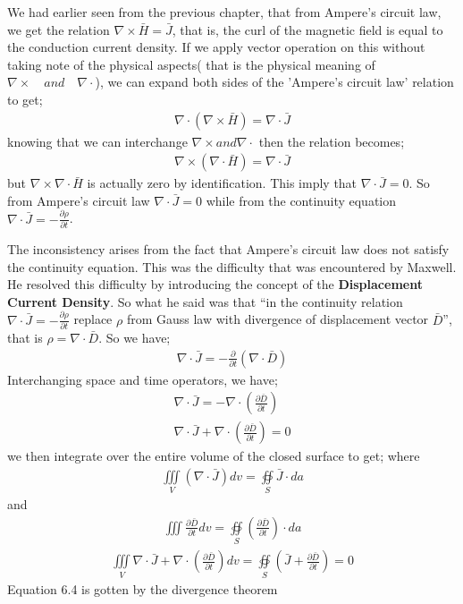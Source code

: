 We had earlier seen from the previous chapter, that from Ampere's circuit law, we get the relation $\nabla\times\bar{H}=\bar{J}$, that is, the curl of the magnetic field is equal to the conduction current density. If we apply vector operation on this without taking note of the physical aspects( that is the physical meaning of $\nabla\times\quad and\quad \nabla\cdot$), we can expand both sides of the 'Ampere's circuit law' relation to get;
\begin{align}
\nabla\cdot(\nabla\times\bar{H})=\nabla\cdot\bar{J}
\end{align}
knowing that we can interchange $\nabla\times and \nabla\cdot$ then the relation becomes;
\begin{align}
\nabla\times(\nabla\cdot\bar{H})=\nabla\cdot\bar{J}
\end{align}
but $\nabla\times\nabla\cdot\bar{H}$ is actually zero by identification. This imply that $\nabla\cdot\bar{J}=0$. So from Ampere's circuit law $\nabla\cdot\bar{J}=0$ while from the continuity equation $\nabla\cdot\bar{J}=-\frac{\partial\rho}{\partial t}$.

The inconsistency arises from the fact that Ampere's circuit law does not satisfy the continuity equation. This was the difficulty that was encountered by Maxwell. He resolved this difficulty by introducing the concept of the \textbf{Displacement Current Density}. So what he said was that \textquotedblleft in the continuity relation $\nabla\cdot\bar{J}=-\frac{\partial\rho}{\partial t}$ replace $\rho$ from Gauss law with divergence of displacement vector $\bar{D}$\textquotedblright, that is $\rho=\nabla\cdot\bar{D}$. So we have;
\begin{align}
\nabla\cdot\bar{J}=-\frac{\partial}{\partial t}(\nabla\cdot\bar{D})
\end{align}
Interchanging space and time operators, we have;
\begin{align}
\nabla\cdot\bar{J}=-\nabla\cdot(\frac{\partial\bar{D}}{\partial t})\\
\nabla\cdot\bar{J}+\nabla\cdot(\frac{\partial\bar{D}}{\partial t}) = 0
\end{align}
we then integrate over the entire volume of the closed surface to get;
where 
\begin{align}
\iiint\limits_V(\nabla\cdot\bar{J}) dv = \oiint\limits_S\bar{J}\cdot da
\end{align} and
\begin{align}
\iiint\frac{\partial\bar{D}}{\partial t}dv = \oiint\limits_S(\frac{\partial\bar{D}}{\partial t})\cdot da
\end{align}
\begin{align}
\iiint\limits_V\nabla\cdot\bar{J}+\nabla\cdot(\frac{\partial\bar{D}}{\partial t})dv=
\oiint\limits_S(\bar{J}+\frac{\partial\bar{D}}{\partial t})=0
\end{align}
Equation 6.4 is gotten by the divergence theorem


